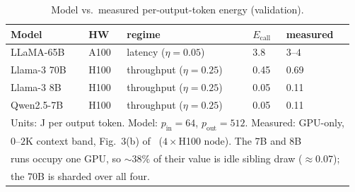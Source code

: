 \documentclass[journal]{IEEEtran}
\newif\ifshowchanges \showchangestrue
\newcommand{\NEW}{\ifshowchanges\color{blue}\fi}
\newcommand{\jpertokSixtyfive}{3.8}    %
\begin{document}
\begin{table}[t]
\caption{Model vs.\ measured per-output-token energy (validation).}
\label{tab:validation}
\centering
\small
\begin{tabular}{@{}lllll@{}}
\toprule
Model & HW & regime & $E_{\mathrm{call}}$ & measured \\
\midrule
LLaMA-65B   & A100 & latency ($\eta{=}0.05$)    & \jpertokSixtyfive{} & $3$--$4$~\cite{samsi2023words} \\
Llama-3 70B & H100 & throughput ($\eta=0.25$) & 0.45 & 0.69~\cite{tokenpowerbench2026} \\
Llama-3 8B  & H100 & throughput ($\eta=0.25$) & 0.05 & 0.11~\cite{tokenpowerbench2026} \\
\NEW{}Qwen2.5-7B  & \NEW{}H100 & \NEW{}throughput ($\eta=0.25$) & \NEW{}0.05 & \NEW{}0.11~\cite{tokenpowerbench2026} \\
\bottomrule
\multicolumn{5}{l}{\footnotesize Units: J per output token. \NEW{}Model: $p_{\mathrm{in}}{=}64$, $p_{\mathrm{out}}{=}512$. Measured: GPU-only,} \\
\multicolumn{5}{l}{\footnotesize \NEW{}$0$--$2$K context band, Fig.~3(b) of~\cite{tokenpowerbench2026} ($4{\times}$H100 node). The 7B and 8B} \\
\multicolumn{5}{l}{\footnotesize \NEW{}runs occupy one GPU, so ${\sim}38\%$ of their value is idle sibling draw ($\approx\!0.07$);} \\
\multicolumn{5}{l}{\footnotesize \NEW{}the 70B is sharded over all four.}
\end{tabular}
\end{table}
\end{document}
